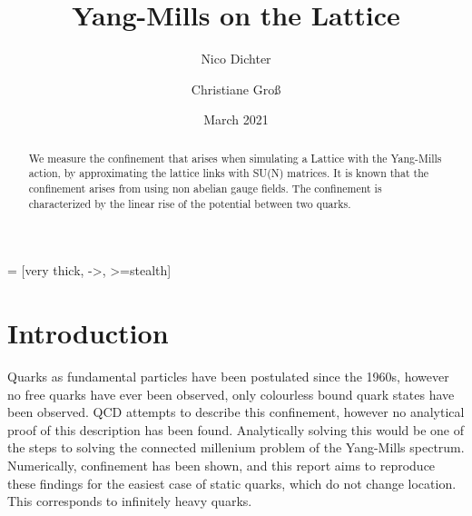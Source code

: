 \documentclass[%
 reprint,
 amsmath,amssymb,
 aps,
]{revtex4-1}
\begin{document}
	 = [very thick, ->, >=stealth]

\title{Yang-Mills on the Lattice}%

\author{Nico Dichter}
\author{Christiane Gro\ss{}}


\date{March 2021}%

\begin{abstract}
	We measure the confinement that arises when simulating a Lattice with the Yang-Mills action, by approximating the lattice links with SU(N) matrices. It is known that the confinement arises from using non abelian gauge fields. The confinement is characterized by the linear rise of the potential between two quarks.
\end{abstract}
\maketitle


\section{Introduction}

Quarks as fundamental particles have been postulated since the 1960s, however no free quarks have ever been observed, only colourless bound quark states have been observed. QCD attempts to describe this confinement, however no analytical proof of this description has been found. Analytically solving this would be one of the steps to solving the connected millenium problem of the Yang-Mills spectrum. Numerically, confinement has been shown, and this report aims to reproduce these findings for the easiest case of static quarks, which do not change location.
This corresponds to infinitely heavy quarks. 
\end{document}
